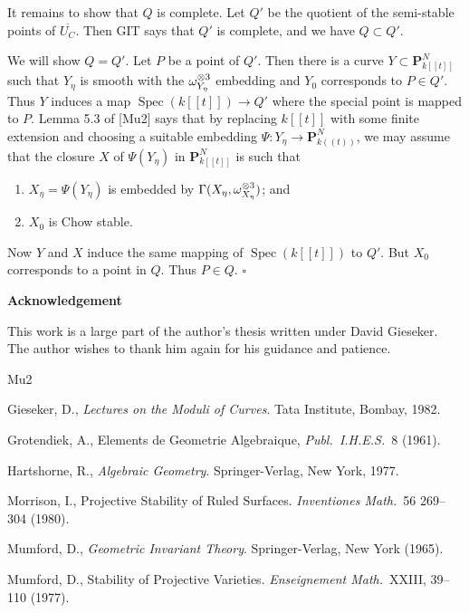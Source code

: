 \documentclass[12pt]{memoir}
\providecommand{\Spec}{\operatorname{Spec}}
\begin{document}
\begin{ptcbp}
It remains to show that $Q$ is complete. Let $Q'$ be the quotient of the semi-stable points of $\overline{U_C}$. Then GIT says that $Q'$ is complete, and we have $Q \subset Q'$.

We will show $Q = Q'$. Let $P$ be a point of $Q'$. Then there is a curve $Y \subset \mathbf{P}^N_{k[[t]]}$ such that $Y_\eta$ is smooth with the $\omega_{Y_\eta}^{\otimes 3}$ embedding and $Y_0$ corresponds to $P \in Q'$. Thus $Y$ induces a map $\Spec(k[[t]]) \to Q'$ where the special point is mapped to $P$. Lemma 5.3 of [Mu2] says that by replacing $k[[t]]$ with some finite extension and choosing a suitable embedding $\Psi\colon Y_\eta \to \mathbf{P}^N_{k((t))}$, we may assume that the closure $X$ of $\Psi(Y_\eta)$ in $\mathbf{P}^N_{k[[t]]}$ is such that

\begin{enumerate}[\upshape(i)]
\item $X_\eta = \Psi(Y_\eta)$ is embedded by $\Gamma(X_\eta, \omega_{X_\eta}^{\otimes 3})$; and
\item $X_0$ is Chow stable.
\end{enumerate}

Now $Y$ and $X$ induce the same mapping of $\Spec(k[[t]])$ to $Q'$. But $X_0$ corresponds to a point in $Q$. Thus $P \in Q$. \hfill$\square$
\end{ptcbp}

\bigskip

\noindent\textbf{Acknowledgement}

\medskip

This work is a large part of the author's thesis written under David Gieseker. The author wishes to thank him again for his guidance and patience.


\begin{thebibliography}{Mu2}

 Gieseker, D., \emph{Lectures on the Moduli of Curves}. Tata Institute, Bombay, 1982.

 Grotendiek, A., Elements de Geometrie Algebraique, \emph{Publ.\ I.H.E.S.}\ 8 (1961).

 Hartshorne, R., \emph{Algebraic Geometry}. Springer-Verlag, New York, 1977.

 Morrison, I., Projective Stability of Ruled Surfaces. \emph{Inventiones Math.}\ 56 269--304 (1980).

 Mumford, D., \emph{Geometric Invariant Theory}. Springer-Verlag, New York (1965).

 Mumford, D., Stability of Projective Varieties. \emph{Enseignement Math.}\ XXIII, 39--110 (1977).

\end{thebibliography}
\end{document}
